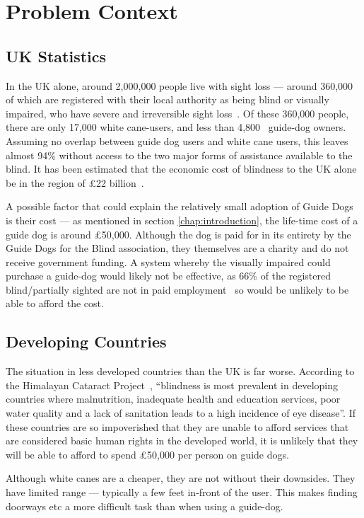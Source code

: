 \section{Problem Context}
\subsection{UK Statistics}
In the UK alone, around 2,000,000 people live with sight loss --- around 360,000 of which are registered with their local authority as being blind or visually impaired, who have severe and irreversible sight loss~\cite{uk-blind}.  Of these 360,000 people, there are only 17,000 white cane-users, and less than 4,800~\cite{guidedog-count} guide-dog owners. Assuming no overlap between guide dog users and white cane users, this leaves almost 94\% without access to the two major forms of assistance available to the blind. It has been estimated that the economic cost of blindness to the UK alone be in the region of \pounds22 billion~\cite{blindcost}.

A possible factor that could explain the relatively small adoption of Guide Dogs is their cost --- as mentioned in section \ref{chap:introduction}, the life-time cost of a guide dog is around \pounds50,000. Although the dog is paid for in its entirety by the Guide Dogs for the Blind association, they themselves are a charity and do not receive government funding. A system whereby the visually impaired could purchase a guide-dog would likely not be effective, as 66\% of the registered blind/partially sighted are not in paid employment~\cite{afbff} so would be unlikely to be able to afford the cost.

\subsection{Developing Countries}
The situation in less developed countries than the UK is far worse. According to the Himalayan Cataract Project~\cite{worldblindness}, ``blindness is most prevalent in developing countries where malnutrition, inadequate health and education services, poor water quality and a lack of sanitation leads to a high incidence of eye disease''. If these countries are so impoverished that they are unable to afford services that are considered basic human rights in the developed world, it is unlikely that they will be able to afford to spend \pounds50,000 per person on guide dogs. 

Although white canes are a cheaper, they are not without their downsides. They have limited range --- typically a few feet in-front of the user. This makes finding doorways etc a more difficult task than when using a guide-dog.

